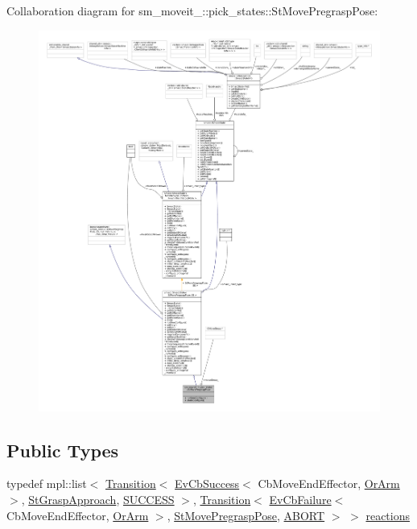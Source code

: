 Collaboration diagram for sm\+\_\+moveit\+\_\+:\+:pick\+\_\+states\+:\+:St\+Move\+Pregrasp\+Pose\+:
\nopagebreak
\begin{figure}[H]
\begin{center}
\leavevmode
\includegraphics[width=350pt]{structsm__moveit__4_1_1pick__states_1_1StMovePregraspPose__coll__graph}
\end{center}
\end{figure}
\subsection*{Public Types}
\begin{DoxyCompactItemize}
\item 
typedef mpl\+::list$<$ \hyperlink{classsmacc_1_1Transition}{Transition}$<$ \hyperlink{structsmacc_1_1EvCbSuccess}{Ev\+Cb\+Success}$<$ Cb\+Move\+End\+Effector, \hyperlink{classsm__moveit__4_1_1OrArm}{Or\+Arm} $>$, \hyperlink{structsm__moveit__4_1_1pick__states_1_1StGraspApproach}{St\+Grasp\+Approach}, \hyperlink{structsmacc_1_1default__transition__tags_1_1SUCCESS}{S\+U\+C\+C\+E\+SS} $>$, \hyperlink{classsmacc_1_1Transition}{Transition}$<$ \hyperlink{structsmacc_1_1EvCbFailure}{Ev\+Cb\+Failure}$<$ Cb\+Move\+End\+Effector, \hyperlink{classsm__moveit__4_1_1OrArm}{Or\+Arm} $>$, \hyperlink{structsm__moveit__4_1_1pick__states_1_1StMovePregraspPose}{St\+Move\+Pregrasp\+Pose}, \hyperlink{structsmacc_1_1default__transition__tags_1_1ABORT}{A\+B\+O\+RT} $>$ $>$ \hyperlink{structsm__moveit__4_1_1pick__states_1_1StMovePregraspPose_ac50bbd9fc0cba7d84e41443e4ddda17d}{reactions}
\end{DoxyCompactItemize}
